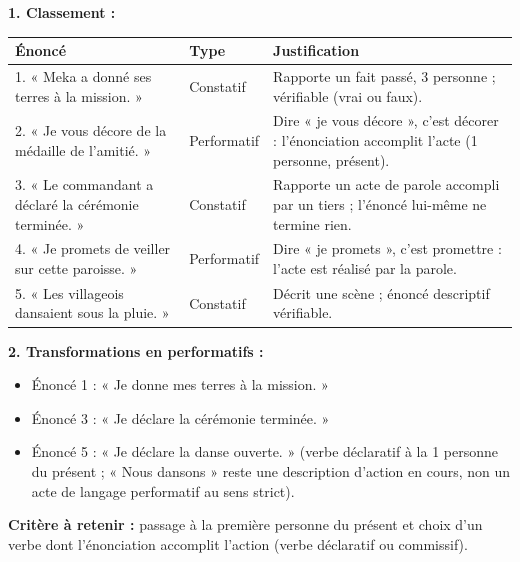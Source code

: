 \documentclass[11pt]{article}
\begin{document}
\begin{corrige}
\textbf{1. Classement :}
\begin{center}
\begin{tabularx}{\linewidth}{|l|X|X|}
\hline
\rowcolor{popblueL} \textbf{Énoncé} & \textbf{Type} & \textbf{Justification} \\
\hline
1. « Meka a donné ses terres à la mission. » & Constatif & Rapporte un fait passé, 3\up{e} personne ; vérifiable (vrai ou faux). \\
\hline
2. « Je vous décore de la médaille de l'amitié. » & Performatif & Dire « je vous décore », c'est décorer : l'énonciation accomplit l'acte (1\up{re} personne, présent). \\
\hline
3. « Le commandant a déclaré la cérémonie terminée. » & Constatif & Rapporte un acte de parole accompli par un tiers ; l'énoncé lui-même ne termine rien. \\
\hline
4. « Je promets de veiller sur cette paroisse. » & Performatif & Dire « je promets », c'est promettre : l'acte est réalisé par la parole. \\
\hline
5. « Les villageois dansaient sous la pluie. » & Constatif & Décrit une scène ; énoncé descriptif vérifiable. \\
\hline
\end{tabularx}
\end{center}
\textbf{2. Transformations en performatifs :}
\begin{itemize}
\item Énoncé 1 : « Je donne mes terres à la mission. »
\item Énoncé 3 : « Je déclare la cérémonie terminée. »
\item Énoncé 5 : « Je déclare la danse ouverte. » (verbe déclaratif à la 1 personne du présent ; « Nous dansons » reste une description d'action en cours, non un acte de langage performatif au sens strict).
\end{itemize}
\textbf{Critère à retenir :} passage à la première personne du présent et choix d'un verbe dont l'énonciation accomplit l'action (verbe déclaratif ou commissif).
\end{corrige}
\end{document}
